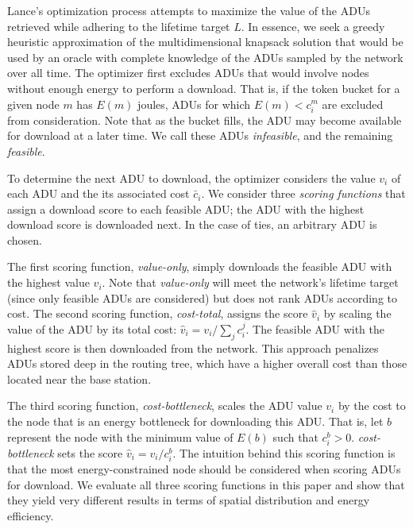 Lance's optimization process attempts to maximize the value of the ADUs
retrieved while adhering to the lifetime target $L$. In essence, we seek a
greedy heuristic approximation of the multidimensional knapsack solution that
would be used by an oracle with complete knowledge of the ADUs sampled by the
network over all time.  The optimizer first excludes ADUs that would involve
nodes without enough energy to perform a download.  That is, if the token
bucket for a given node $m$ has $E(m)$ joules, ADUs for which $E(m) < c_i^m$
are excluded from consideration.  Note that as the bucket fills, the ADU may
become available for download at a later time. We call these ADUs {\em
infeasible}, and the remaining {\em feasible}.

To determine the next ADU to download, the optimizer considers the 
value $v_i$ of each ADU and the its associated cost $\bar{c}_i$.
We consider three {\em scoring functions} that assign a 
download score to each feasible ADU; the ADU with the highest download score
is downloaded next. In the case of ties, an arbitrary ADU is chosen.

The first scoring function, {\em value-only}, simply downloads the feasible
ADU with the highest value $v_i$. Note that {\em value-only} will meet the
network's lifetime target (since only feasible ADUs are considered) but does
not rank ADUs according to cost.  The second scoring function, {\em
cost-total}, assigns the score $\hat{v}_i$ by scaling the value of the ADU by
its total cost: $\hat{v}_i = v_i / \sum_j c_i^j$. The feasible ADU with the
highest score is then downloaded from the network. This approach penalizes
ADUs stored deep in the routing tree, which have a higher overall cost than
those located near the base station. 

The third scoring function, {\em cost-bottleneck}, scales the ADU value $v_i$ 
by the cost to the node that is an energy bottleneck for downloading
this ADU. That is, let $b$ represent the node with the minimum value
of $E(b)$ such that $c_i^b > 0$. {\em cost-bottleneck} sets the score
$\hat{v}_i = v_i / c_i^b$. The intuition behind this scoring function is
that the most energy-constrained node should be considered when
scoring ADUs for download. We evaluate all three scoring functions in 
this paper and show that they yield very different results in terms
of spatial distribution and energy efficiency.

